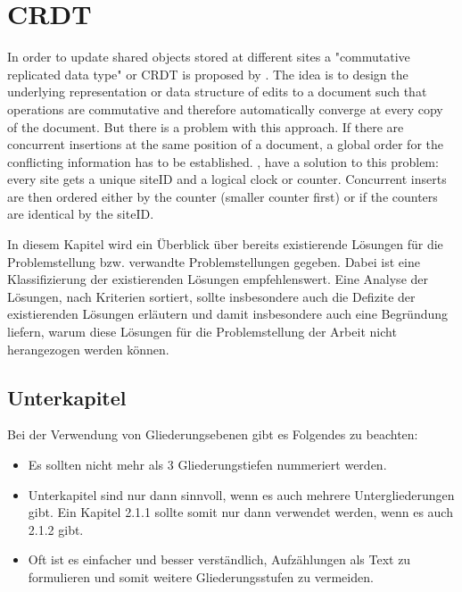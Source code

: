 \section{CRDT}
In order to update shared objects stored at different sites a "commutative replicated data type" or CRDT is proposed by \cite{PreguicaMarquesShapiroLetia:2009}. The idea is to design the underlying representation or data structure of edits to a document such that operations are commutative and therefore automatically converge at every copy of the document.
But there is a problem with this approach. If there are concurrent insertions at the same position of a document, a global order for the conflicting information has to be established. \cite{PreguicaMarquesShapiroLetia:2009},\cite{Oster:2006:DataconsistencyforP2Pcollaborativeediting} have a solution to this problem: every site gets a unique siteID and a logical clock or counter. Concurrent inserts are then ordered either by the counter (smaller counter first) or if the counters are identical by the siteID.

In diesem Kapitel wird ein Überblick über bereits existierende Lösungen für die Problemstellung bzw. verwandte Problemstellungen gegeben. Dabei ist eine Klassifizierung der existierenden Lösungen empfehlenswert. Eine Analyse der Lösungen, nach Kriterien sortiert, sollte insbesondere auch die Defizite der existierenden Lösungen erläutern und damit insbesondere auch eine Begründung liefern, warum diese Lösungen für die Problemstellung der Arbeit nicht herangezogen werden können.

\subsection{Unterkapitel}

Bei der Verwendung von Gliederungsebenen gibt es Folgendes zu beachten:
\begin{itemize}
	\item Es sollten nicht mehr als 3 Gliederungstiefen nummeriert werden.
	\item Unterkapitel sind nur dann sinnvoll, wenn es auch mehrere Untergliederungen gibt. Ein Kapitel 2.1.1 sollte somit nur dann verwendet werden, wenn es auch 2.1.2 gibt.
	\item Oft ist es einfacher und besser verständlich, Aufzählungen als Text zu formulieren und somit weitere Gliederungsstufen zu vermeiden.
\end{itemize}

